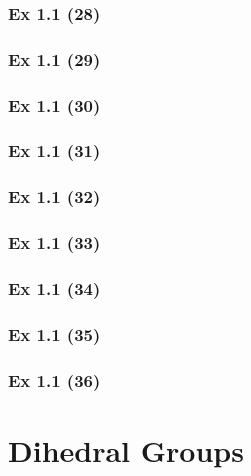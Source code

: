 \subsubsection{Ex 1.1 (28)}\label{sec:Ex_1.1.28}

\subsubsection{Ex 1.1 (29)}\label{sec:Ex_1.1.29}

\subsubsection{Ex 1.1 (30)}\label{sec:Ex_1.1.30}

\newpage		%

\subsubsection{Ex 1.1 (31)}\label{sec:Ex_1.1.31}

\subsubsection{Ex 1.1 (32)}\label{sec:Ex_1.1.32}

\subsubsection{Ex 1.1 (33)}\label{sec:Ex_1.1.33}

\subsubsection{Ex 1.1 (34)}\label{sec:Ex_1.1.34}

\subsubsection{Ex 1.1 (35)}\label{sec:Ex_1.1.35}

\subsubsection{Ex 1.1 (36)}\label{sec:Ex_1.1.36}

\newpage		%

\section{Dihedral Groups}\label{sec:1.2}
